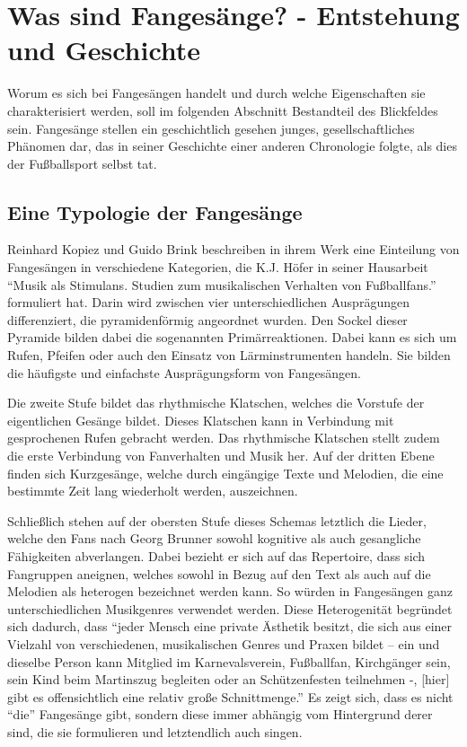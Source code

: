 \section{Was sind Fangesänge? - Entstehung und Geschichte}
Worum es sich bei Fangesängen handelt und durch welche Eigenschaften sie charakterisiert werden, soll im folgenden Abschnitt Bestandteil des Blickfeldes sein.
Fangesänge stellen ein geschichtlich gesehen junges, gesellschaftliches Phänomen dar, das in seiner Geschichte einer anderen Chronologie folgte, als dies der Fußballsport selbst tat.

\subsection{Eine Typologie der Fangesänge}
Reinhard Kopiez und Guido Brink beschreiben in ihrem Werk eine Einteilung von Fangesängen in verschiedene Kategorien, die K.J. Höfer in seiner Hausarbeit "`Musik als Stimulans. Studien zum musikalischen Verhalten von Fußballfans."' \cite[S. 15]{RK98} formuliert hat.
Darin wird zwischen vier unterschiedlichen Ausprägungen differenziert, die pyramidenförmig angeordnet wurden.
Den Sockel dieser Pyramide bilden dabei die sogenannten Primärreaktionen.
Dabei kann es sich um Rufen, Pfeifen oder auch den Einsatz von Lärminstrumenten handeln.
Sie bilden die häufigste und einfachste Ausprägungsform von Fangesängen.

Die zweite Stufe bildet das rhythmische Klatschen, welches die Vorstufe der eigentlichen Gesänge bildet.
Dieses Klatschen kann in Verbindung mit gesprochenen Rufen gebracht werden. \cite[S. 196]{AB08}
Das rhythmische Klatschen stellt zudem die erste Verbindung von Fanverhalten und Musik her.
Auf der dritten Ebene finden sich Kurzgesänge, welche durch eingängige Texte und Melodien, die eine bestimmte Zeit lang wiederholt werden, auszeichnen.

Schließlich stehen auf der obersten Stufe dieses Schemas letztlich die Lieder, welche den Fans nach Georg Brunner sowohl kognitive als auch gesangliche Fähigkeiten abverlangen.
Dabei bezieht er sich auf das Repertoire, dass sich Fangruppen aneignen, welches sowohl in Bezug auf den Text als auch auf die Melodien als heterogen bezeichnet werden kann.
So würden in Fangesängen ganz unterschiedlichen Musikgenres verwendet werden. \cite[S. 197]{AB08}
Diese Heterogenität begründet sich dadurch, dass "`jeder Mensch eine private Ästhetik besitzt, die sich aus einer Vielzahl von verschiedenen, musikalischen Genres und Praxen bildet – ein und dieselbe Person kann Mitglied im Karnevalsverein, Fußballfan, Kirchgänger sein, sein Kind beim Martinszug begleiten oder an Schützenfesten teilnehmen -, [hier] gibt es offensichtlich eine relativ große Schnittmenge."' \cite[S.197]{AB08}
Es zeigt sich, dass es nicht "`die"' Fangesänge gibt, sondern diese immer abhängig vom Hintergrund derer sind, die sie formulieren und letztendlich auch singen.

